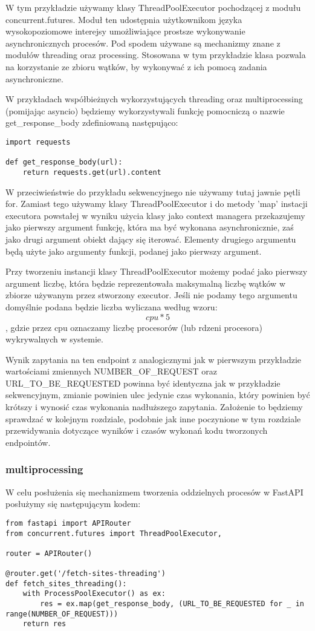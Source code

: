 W tym przykładzie używamy klasy ThreadPoolExecutor pochodzącej z modułu concurrent.futures. Moduł ten udostępnia użytkownikom języka wysokopoziomowe interejsy umożliwiające prostsze wykonywanie asynchronicznych procesów. Pod spodem używane są mechanizmy znane z modułów threading oraz processing. Stosowana w tym przykładzie klasa pozwala na korzystanie ze zbioru wątków, by wykonywać z ich pomocą zadania asynchroniczne.

W przykładach współbieżnych wykorzystujących threading oraz multiprocessing (pomijając asyncio) będziemy wykorzystywali funkcję pomocniczą o nazwie get\_response\_body zdefiniowaną następująco:
\begin{lstlisting}
import requests

def get_response_body(url):
    return requests.get(url).content
\end{lstlisting}

W przeciwieństwie do przykładu sekwencyjnego nie używamy tutaj jawnie pętli for. Zamiast tego używamy klasy ThreadPoolExecutor i do metody 'map' instacji executora powstałej w wyniku użycia klasy jako context managera przekazujemy jako pierwszy argument funkcję, która ma być wykonana asynchronicznie, zaś jako drugi argument obiekt dający się iterować. Elementy drugiego argumentu będą użyte jako argumenty funkcji, podanej jako pierwszy argument.

Przy tworzeniu instancji klasy ThreadPoolExecutor możemy podać jako pierwszy argument liczbę, która będzie reprezentowała maksymalną liczbę wątków w zbiorze używanym przez stworzony executor. Jeśli nie podamy tego argumentu domyślnie podana będzie liczba wyliczana według wzoru: 
\[ cpu * 5 \]
, gdzie przez cpu oznaczamy liczbę procesorów (lub rdzeni procesora) wykrywalnych w systemie.

Wynik zapytania na ten endpoint z analogicznymi jak w pierwszym przykładzie wartościami zmiennych NUMBER\_OF\_REQUEST oraz URL\_TO\_BE\_REQUESTED powinna być identyczna jak w przykładzie sekwencyjnym, zmianie powinien ulec jedynie czas wykonania, który powinien być krótszy i wynosić czas wykonania nadłuższego zapytania. Założenie to będziemy sprawdzać w kolejnym rozdziale, podobnie jak inne poczynione w tym rozdziale przewidywania dotyczące wyników i czasów wykonań kodu tworzonych endpointów.

\subsubsection{multiprocessing}
W celu posłużenia się mechanizmem tworzenia oddzielnych procesów w FastAPI posłużymy się następującym kodem:
\begin{lstlisting}
from fastapi import APIRouter
from concurrent.futures import ThreadPoolExecutor,

router = APIRouter()

@router.get('/fetch-sites-threading')
def fetch_sites_threading():
    with ProcessPoolExecutor() as ex:
        res = ex.map(get_response_body, (URL_TO_BE_REQUESTED for _ in range(NUMBER_OF_REQUEST)))
    return res
\end{lstlisting}

